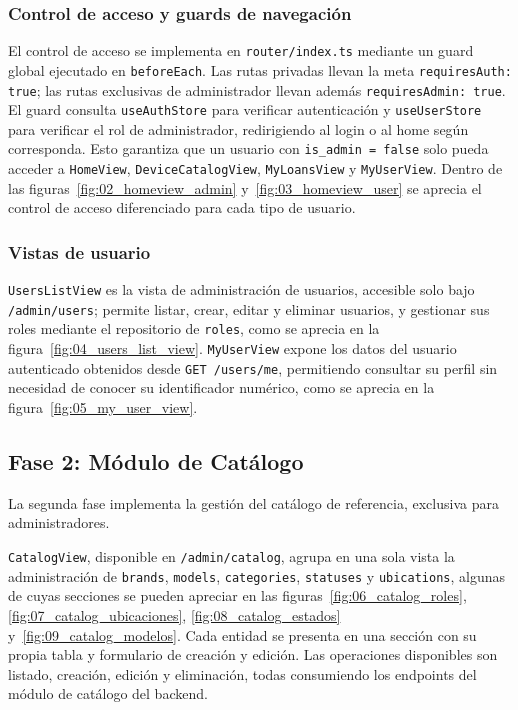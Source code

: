 \subsubsection*{Control de acceso y guards de navegación}

El control de acceso se implementa en \texttt{router/index.ts} mediante un guard 
global ejecutado en \texttt{beforeEach}. Las rutas privadas llevan la meta 
\texttt{requiresAuth: true}; las rutas exclusivas de administrador llevan además 
\texttt{requiresAdmin: true}. El guard consulta \texttt{useAuthStore} para verificar 
autenticación y \texttt{useUserStore} para verificar el rol de administrador, 
redirigiendo al login o al home según corresponda. Esto garantiza que un usuario con 
\texttt{is\_admin = false} solo pueda acceder a \texttt{HomeView}, 
\texttt{DeviceCatalogView}, \texttt{MyLoansView} y \texttt{MyUserView}.
Dentro de las figuras~\ref{fig:02_homeview_admin} y~\ref{fig:03_homeview_user} 
se aprecia el control de acceso diferenciado para cada tipo de usuario.

\subsubsection*{Vistas de usuario}

\texttt{UsersListView} es la vista de administración de usuarios, accesible solo bajo 
\texttt{/admin/users}; permite listar, crear, editar y eliminar usuarios, y gestionar 
sus roles mediante el repositorio de \texttt{roles}, como se aprecia en la 
figura~\ref{fig:04_users_list_view}.
\texttt{MyUserView} expone los 
datos del usuario autenticado obtenidos desde \texttt{GET /users/me}, permitiendo 
consultar su perfil sin necesidad de conocer su identificador numérico, como se 
aprecia en la figura~\ref{fig:05_my_user_view}.

\subsection{Fase 2: Módulo de Catálogo}

La segunda fase implementa la gestión del catálogo de referencia, exclusiva para 
administradores.

\texttt{CatalogView}, disponible en \texttt{/admin/catalog}, agrupa en una sola 
vista la administración de \texttt{brands}, \texttt{models}, \texttt{categories}, 
\texttt{statuses} y \texttt{ubications}, algunas de cuyas secciones se pueden 
apreciar en las figuras~\ref{fig:06_catalog_roles}, \ref{fig:07_catalog_ubicaciones}, 
\ref{fig:08_catalog_estados} y~\ref{fig:09_catalog_modelos}.
Cada entidad se presenta en una sección 
con su propia tabla y formulario de creación y edición. Las operaciones disponibles 
son listado, creación, edición y eliminación, todas consumiendo los endpoints del 
módulo de catálogo del backend.

